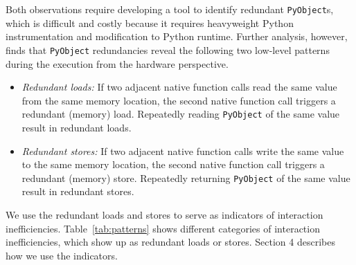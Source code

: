 Both observations require developing a tool to identify redundant {\tt PyObject}s, which is difficult and costly because it requires heavyweight Python instrumentation and modification to Python runtime. Further analysis, however, finds that {\tt PyObject} redundancies reveal the following two low-level patterns during the execution from the hardware perspective.
\begin{itemize}[leftmargin=*]
    \item {\em Redundant loads:} If two adjacent native function calls read the same value from the same memory location, the second native function call triggers a redundant (memory) load. Repeatedly reading {\tt PyObject} of the same value result in redundant loads.
    \item {\em Redundant stores:} If two adjacent native function calls write the same value to the same memory location, the second native function call triggers a redundant (memory) store. Repeatedly returning {\tt PyObject} of the same value result in redundant stores.
\end{itemize}
We use the redundant loads and stores to serve as indicators of interaction inefficiencies. Table~\ref{tab:patterns} shows different categories of interaction inefficiencies, which show up as redundant loads or stores. Section 4 describes how we use the indicators. 








